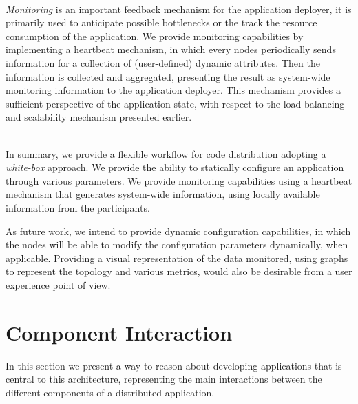 \documentclass[12pt, titlepage]{uo_temp}
\begin{document}
     \\ \emph{Monitoring} is an important feedback mechanism for the application deployer,
     it is primarily used to anticipate possible bottlenecks or the track the resource
     consumption of the application. We provide monitoring capabilities by implementing a
     heartbeat mechanism, in which every nodes periodically sends information for a
     collection of (user-defined) dynamic attributes. Then the information is collected
     and aggregated, presenting the result as system-wide monitoring information to the
     application deployer. This mechanism provides a sufficient perspective of the
     application state, with respect to the load-balancing and scalability mechanism
     presented earlier.

     \\ In summary, we provide a flexible workflow for code distribution adopting a
     \emph{white-box} approach. We provide the ability to statically configure an
     application through various parameters. We provide monitoring capabilities using a
     heartbeat mechanism that generates system-wide information, using locally available
     information from the participants.

     As future work, we intend to provide dynamic configuration capabilities, in which the
     nodes will be able to modify the configuration parameters dynamically, when
     applicable. Providing a visual representation of the data monitored, using graphs to
     represent the topology and various metrics, would also be desirable from a user
     experience point of view.

     \section{Component Interaction}
     In this section we present a way to reason about developing applications that is
     central to this architecture, representing the main interactions between the different
     components of a distributed application.
\end{document}
